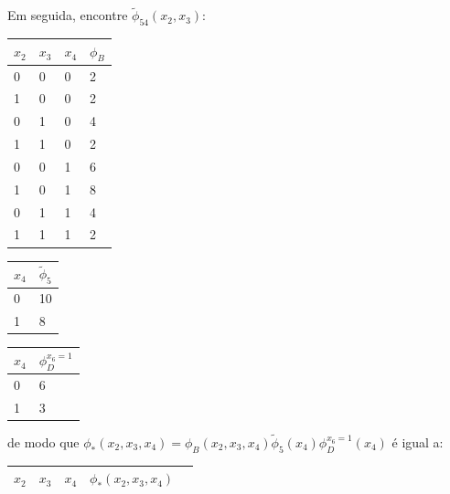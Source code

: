 \begin{exenumerate}
\begin{solution}
        Em seguida, encontre $\tilde{\phi}_{54}(x_2, x_3)$:
        \begin{center}
            \begin{tabular}{llll}
                \toprule
                $x_2$ & $x_3$ & $x_4$ & $\phi_B$\\
                \midrule
                0 & 0 & 0 & 2 \\
                1 & 0 & 0 & 2 \\
                0 & 1 & 0 & 4 \\
                1 & 1 & 0 & 2 \\
                0 & 0 & 1 & 6 \\
                1 & 0 & 1 & 8 \\
                0 & 1 & 1 & 4 \\
                1 & 1 & 1 & 2 \\
                \bottomrule
            \end{tabular}\hspace{2ex}
            \begin{tabular}{ll}
                \toprule
                $x_4$ & $\tilde{\phi}_5$\\
                \midrule
                0 & 10 \\
                1 & 8 \\
                \bottomrule
            \end{tabular}\hspace{2ex}
            \begin{tabular}{ll}
                \toprule
                $x_4$ & $\phi_D^{x_6=1}$\\
                \midrule
                0 & 6 \\
                1 & 3 \\
                \bottomrule
            \end{tabular}
        \end{center}
        de modo que $\phi_*(x_2,x_3,x_4) = \phi_B(x_2, x_3, x_4) \tilde{\phi}_5(x_4) \phi_D^{x_6=1}(x_4)$ \'e igual a:
        \begin{center}
            \begin{tabular}{lllll}
                \toprule
                $x_2$ & $x_3$ & $x_4$ & $\phi_*(x_2,x_3,x_4)$\\
                \midrule

\end{tabular}
\end{center}
\end{solution}
\end{exenumerate}
